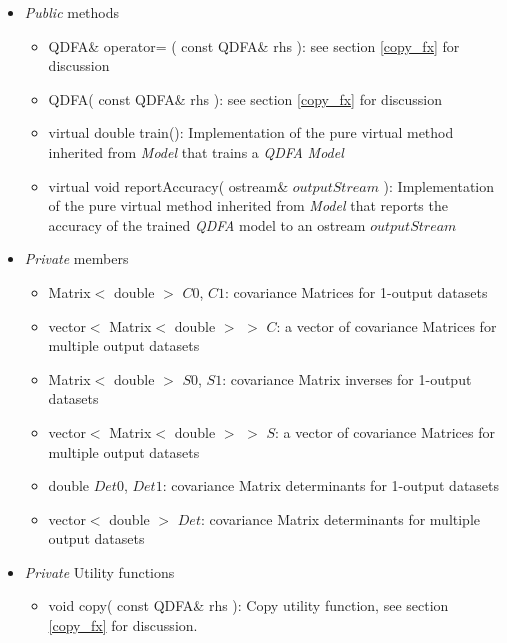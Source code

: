 \documentclass{report}
\begin{document}
\begin{itemize}

\item {\em Public} methods

\begin{itemize}
\item QDFA\& operator= ( const QDFA\& rhs ): see section
      \ref{copy_fx} for discussion
\item QDFA( const QDFA\& rhs ): see section \ref{copy_fx} for
      discussion
\item virtual double train(): Implementation of the pure virtual
      method inherited from {\em Model} that trains a {\em QDFA} {\em
      Model}
\item virtual void reportAccuracy( ostream\& $outputStream$ ):
      Implementation of the pure virtual method inherited from {\em
      Model} that reports the accuracy of the trained {\em QDFA} model
      to an ostream $outputStream$
\end{itemize}

\item {\em Private} members

\begin{itemize}
\item Matrix$<$ double $>$ $C0$, $C1$: covariance Matrices for
      1-output datasets
\item vector$<$ Matrix$<$ double $>$ $>$ $C$: a vector of covariance
      Matrices for multiple output datasets
\item Matrix$<$ double $>$ $S0$, $S1$: covariance Matrix inverses for
      1-output datasets
\item vector$<$ Matrix$<$ double $>$ $>$ $S$: a vector of covariance
      Matrices for multiple output datasets
\item double $Det0$, $Det1$: covariance Matrix determinants for
      1-output datasets
\item vector$<$ double $>$ $Det$: covariance Matrix determinants for
      multiple output datasets
\end{itemize}

\item {\em Private} Utility functions

\begin{itemize}
\item void copy( const QDFA\& rhs ): Copy utility function, see
      section \ref{copy_fx} for discussion.
\end{itemize}

\end{itemize}
\end{document}
